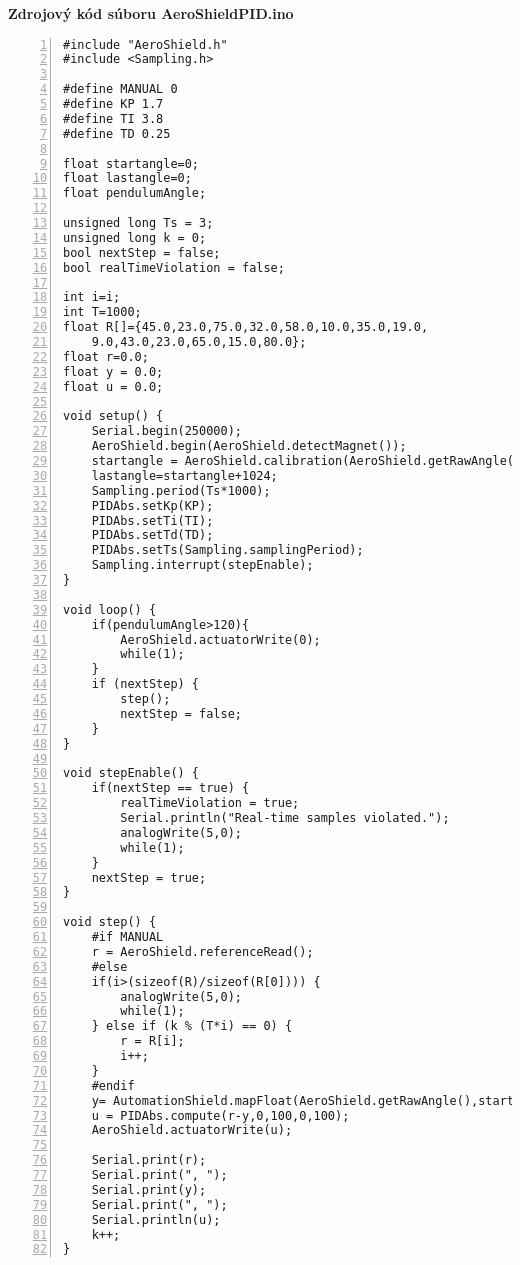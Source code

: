 \LARGE\bf{Zdrojový kód súboru AeroShieldPID.ino}
\label{AeroShieldPID.ino}
\vspace{1cm}
\begin{lstlisting}[numbers=left,basicstyle=\scriptsize,caption={Zdrojový kód súboru AeroShieldPID.ino.},captionpos=b]	
#include "AeroShield.h"              
#include <Sampling.h>   

#define MANUAL 0    
#define KP 1.7  
#define TI 3.8  
#define TD 0.25   

float startangle=0; 
float lastangle=0; 
float pendulumAngle;

unsigned long Ts = 3; 
unsigned long k = 0; 
bool nextStep = false;  
bool realTimeViolation = false;

int i=i;          
int T=1000;           
float R[]={45.0,23.0,75.0,32.0,58.0,10.0,35.0,19.0,
	9.0,43.0,23.0,65.0,15.0,80.0}; 
float r=0.0;          
float y = 0.0;        
float u = 0.0;         

void setup() {           
	Serial.begin(250000);                         
	AeroShield.begin(AeroShield.detectMagnet());
	startangle = AeroShield.calibration(AeroShield.getRawAngle()); 
	lastangle=startangle+1024;                                  
	Sampling.period(Ts*1000);      
	PIDAbs.setKp(KP);       
	PIDAbs.setTi(TI);    
	PIDAbs.setTd(TD);     
	PIDAbs.setTs(Sampling.samplingPeriod); 
	Sampling.interrupt(stepEnable); 
}

void loop() {
	if(pendulumAngle>120){
		AeroShield.actuatorWrite(0);
		while(1);
	} 
	if (nextStep) {    
		step();          
		nextStep = false;  
	}
}

void stepEnable() {             
	if(nextStep == true) {         
		realTimeViolation = true;   
		Serial.println("Real-time samples violated."); 
		analogWrite(5,0);  
		while(1);    
	}
	nextStep = true; 
}

void step() {  
	#if MANUAL                       
	r = AeroShield.referenceRead(); 
	#else        
	if(i>(sizeof(R)/sizeof(R[0]))) {  
		analogWrite(5,0); 
		while(1); 
	} else if (k % (T*i) == 0) {
		r = R[i];
		i++; 
	}
	#endif
	y= AutomationShield.mapFloat(AeroShield.getRawAngle(),startangle,lastangle,0.00,100.00);
	u = PIDAbs.compute(r-y,0,100,0,100);
	AeroShield.actuatorWrite(u);
	
	Serial.print(r);
	Serial.print(", ");
	Serial.print(y); 
	Serial.print(", ");
	Serial.println(u); 
	k++; 
}
\end{lstlisting}